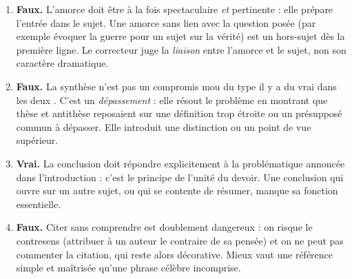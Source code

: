 \documentclass[11pt]{article}
\begin{document}
\begin{corrige}
\begin{enumerate}
\item \textbf{Faux.} L'amorce doit être à la fois spectaculaire \emph{et} pertinente : elle prépare l'entrée dans le sujet. Une amorce sans lien avec la question posée (par exemple évoquer la guerre pour un sujet sur la vérité) est un hors-sujet dès la première ligne. Le correcteur juge la \emph{liaison} entre l'amorce et le sujet, non son caractère dramatique.
\item \textbf{Faux.} La synthèse n'est pas un compromis mou du type \guillemotleft il y a du vrai dans les deux \guillemotright. C'est un \emph{dépassement} : elle résout le problème en montrant que thèse et antithèse reposaient sur une définition trop étroite ou un présupposé commun à dépasser. Elle introduit une distinction ou un point de vue supérieur.
\item \textbf{Vrai.} La conclusion doit répondre explicitement à la problématique annoncée dans l'introduction : c'est le principe de l'unité du devoir. Une conclusion qui ouvre sur un autre sujet, ou qui se contente de résumer, manque sa fonction essentielle.
\item \textbf{Faux.} Citer sans comprendre est doublement dangereux : on risque le contresens (attribuer à un auteur le contraire de sa pensée) et on ne peut pas commenter la citation, qui reste alors décorative. Mieux vaut une référence simple et maîtrisée qu'une phrase célèbre incomprise.
\end{enumerate}
\end{corrige}
\end{document}
